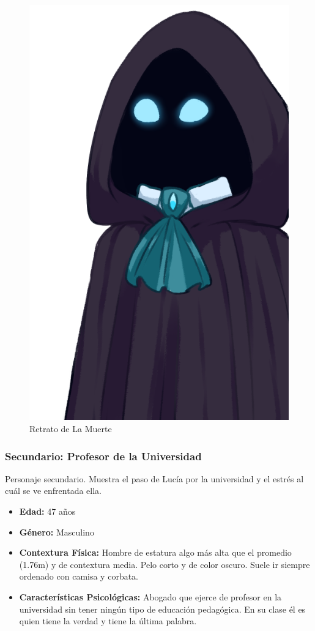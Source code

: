 \begin{figure}[h]
    \centering
    \includegraphics{imgs/muerte.png}
    \caption{Retrato de La Muerte}
    \label{fig:muerte}
\end{figure}

\newpage
\subsubsection{Secundario: Profesor de la Universidad}
Personaje secundario. Muestra el paso de Lucía por la universidad y el estrés al cuál se ve enfrentada ella.

\begin{itemize}
    \item \textbf{Edad:} 47 años
    \item \textbf{Género:} Masculino
    \item \textbf{Contextura Física:} Hombre de estatura algo más alta que el promedio (1.76m) y de contextura media. Pelo corto y de color oscuro. Suele ir siempre ordenado con camisa y corbata.
    \item \textbf{Características Psicológicas:} Abogado que ejerce de profesor en la universidad sin tener ningún tipo de educación pedagógica. En su clase él es quien tiene la verdad y tiene la última palabra.
\end{itemize}

